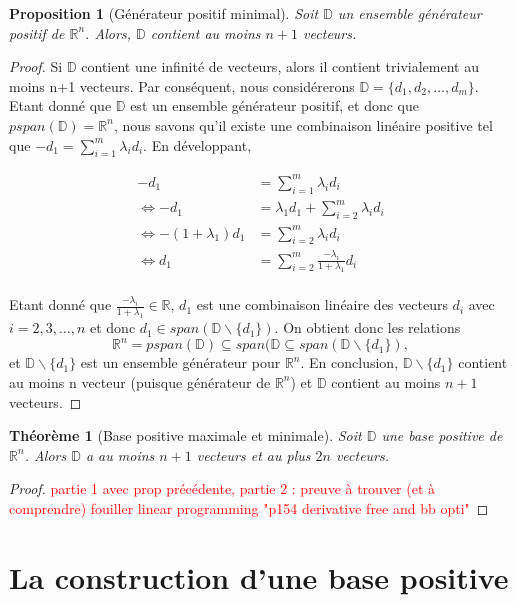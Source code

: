 \documentclass[french]{report}
\newtheorem{thm}{Théorème}[section]
\newtheorem{prop}{Proposition}[section]
\newcommand{\theoreme}[2]{\begin{thm}[#1] #2\end{thm}}
\newcommand{\proposition}[2]{\begin{prop}[#1] #2 \end{prop}}
\newcommand{\preuve}[1]{\begin{proof} #1 \end{proof}}
\newcommand{\D}{\mathbb{D}}
\begin{document}
\proposition{Générateur positif minimal}
{
    Soit $\mathbb{D}$ un ensemble générateur positif de $\mathbb{R}^n$. Alors, $\mathbb{D}$ contient au moins $n+1$ vecteurs.
}

\preuve
{
    Si $\mathbb{D}$ contient une infinité de vecteurs, alors il contient trivialement au moins n+1 vecteurs. Par conséquent, nous considérerons $ \mathbb{D} = \{ d_1,d_2,\dots,d_m \}$. Etant donné que $\D$ est un ensemble générateur positif, et donc que $pspan(\D) = \mathbb{R}^n$, nous savons qu'il existe une combinaison linéaire positive tel que $-d_1 = \sum_{i=1}^m \lambda_i d_i$. En développant,



    \begin{align*}
        -d_1                               & = \sum_{i=1}^m \lambda_i d_i                      \\
        \Leftrightarrow -d_1               & = \lambda_1 d_1 + \sum_{i=2}^m \lambda_i d_i      \\
        \Leftrightarrow -(1+\lambda_1) d_1 & = \sum_{i=2}^m \lambda_i d_i                      \\
        \Leftrightarrow d_1                & = \sum_{i=2}^m \frac{-\lambda_i}{1+\lambda_1} d_i \\
    \end{align*}

    Etant donné que $\frac{-\lambda_i}{1+\lambda_1} \in \mathbb{R}$, $d_1$ est une combinaison linéaire des vecteurs $d_i$ avec $i=2,3,\dots,n$ et donc $d_1 \in span(\mathbb{D}\backslash \{ d_1 \})$. On obtient donc les relations
    $$
        \mathbb{R}^n = pspan(\mathbb{D}) \subseteq span(\mathbb{D} \subseteq span(\mathbb{D}\backslash \{ d_1 \}),
    $$
    et $\D \backslash \{d_1\}$ est un ensemble générateur pour $\mathbb{R}^n $. En conclusion, $\D \backslash \{d_1\} $ contient au moins n vecteur (puisque générateur de $\mathbb{R}^n$) et $\D$ contient au moins $n+1$ vecteurs.
}

\theoreme{Base positive maximale et minimale}
{
    Soit $\D$ une base positive de $\mathbb{R}^n$. Alors $\D$ a au moins $n+1$ vecteurs et au plus $2n$ vecteurs.
}
\preuve
{
    \textcolor{red}{partie 1 avec prop précédente, partie 2 : preuve à trouver (et à comprendre) fouiller linear programming "p154 derivative free and bb opti"}
}

\section{La construction d'une base positive}
\end{document}
